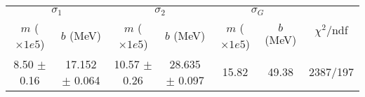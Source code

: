 \begin{tabular}{cc|cc|cc||c}
\multicolumn{2}{c|}{$\sigma_1$} & \multicolumn{2}{|c}{$\sigma_2$} & \multicolumn{2}{|c}{$\sigma_G$}  & \multirow{2}{*}{$\chi^2/$ndf}\\
$m$ ($\times1e5$) & $b$ (MeV) & $m$ ($\times1e5$) & $b$ (MeV) & $m$ ($\times1e5$) & $b$ (MeV) & \\
\hline
8.50 $\pm$ 0.16 & 17.152 $\pm$ 0.064 & 10.57 $\pm$ 0.26 & 28.635 $\pm$ 0.097 & 15.82 & 49.38 & 2387/197\\
\end{tabular}
